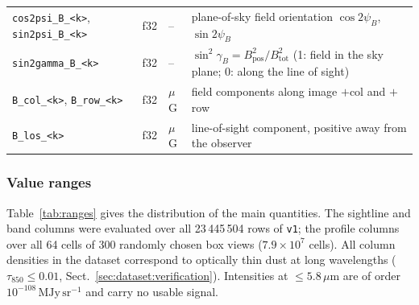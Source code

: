 \begin{longtable}{@{}p{}p{}p{}p{}@{}}
  \texttt{cos2psi\_B\_<k>}, \texttt{sin2psi\_B\_<k>} & f32 & -- & plane-of-sky field orientation $\cos2\psi_B$, $\sin2\psi_B$ \\
  \texttt{sin2gamma\_B\_<k>} & f32 & -- & $\sin^2\gamma_B=B_\mathrm{pos}^2/B_\mathrm{tot}^2$ (1: field in the sky plane; 0: along the line of sight) \\
  \texttt{B\_col\_<k>}, \texttt{B\_row\_<k>} & f32 & $\mu$G & field components along image $+$col and $+$row \\
  \texttt{B\_los\_<k>} & f32 & $\mu$G & line-of-sight component, positive away from the observer \\
\end{longtable}
\endgroup

\subsubsection{Value ranges}

Table~\ref{tab:ranges} gives the distribution of the main quantities. The sightline and band columns were
evaluated over all 23\,445\,504 rows of \texttt{v1}; the profile columns over all 64 cells of 300 randomly chosen
box views ($7.9\times10^{7}$ cells). All column densities in the dataset correspond to optically thin dust at
long wavelengths ($\tau_{850}\le0.01$, Sect.~\ref{sec:dataset:verification}). Intensities at
$\le5.8\,\mu\mathrm{m}$ are of order $10^{-108}\,\mathrm{MJy\,sr^{-1}}$ and carry no usable signal.

